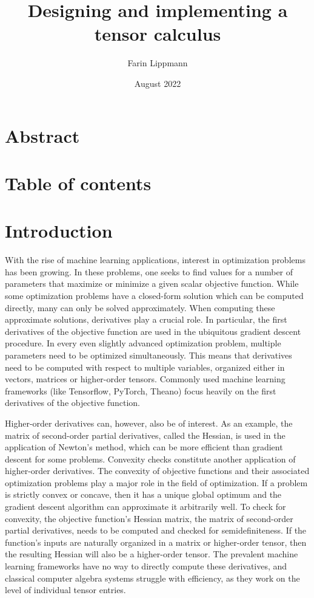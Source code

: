 \documentclass[12pt, a4paper]{report}
\title{Designing and implementing a tensor calculus}
\author{Farin Lippmann}
\date{August 2022}
\begin{document}
\maketitle

\chapter{Abstract}

\chapter{Table of contents}
\setcounter{page}{3}

\chapter{Introduction}

With the rise of machine learning applications, interest in optimization problems has been growing.  %
In these problems, one seeks to find values for a number of parameters that maximize or minimize a given scalar objective function.
While some optimization problems have a closed-form solution which can be computed directly, many can only be solved approximately.
When computing these approximate solutions, derivatives play a crucial role.
In particular, the first derivatives of the objective function are used in the ubiquitous gradient descent procedure.
In every even slightly advanced optimization problem, multiple parameters need to be optimized simultaneously.
This means that derivatives need to be computed with respect to multiple variables, organized either in vectors, matrices or higher-order tensors.
Commonly used machine learning frameworks (like Tensorflow, PyTorch, Theano) focus heavily on the first derivatives of the objective function.

Higher-order derivatives can, however, also be of interest.
As an example, the matrix of second-order partial derivatives, called the Hessian, is used in the application of Newton's method, which can be more efficient than gradient descent for some problems.
Convexity checks constitute another application of higher-order derivatives.
The convexity of objective functions and their associated optimization problems play a major role in the field of optimization.
If a problem is strictly convex or concave, then it has a unique global optimum and the gradient descent algorithm can approximate it arbitrarily well.
To check for convexity, the objective function's Hessian matrix, the matrix of second-order partial derivatives, needs to be computed and checked for semidefiniteness.
If the function's inputs are naturally organized in a matrix or higher-order tensor, then the resulting Hessian will also be a higher-order tensor.
The prevalent machine learning frameworks have no way to directly compute these derivatives, and classical computer algebra systems struggle with efficiency, as they work on the level of individual tensor entries.
\end{document}
